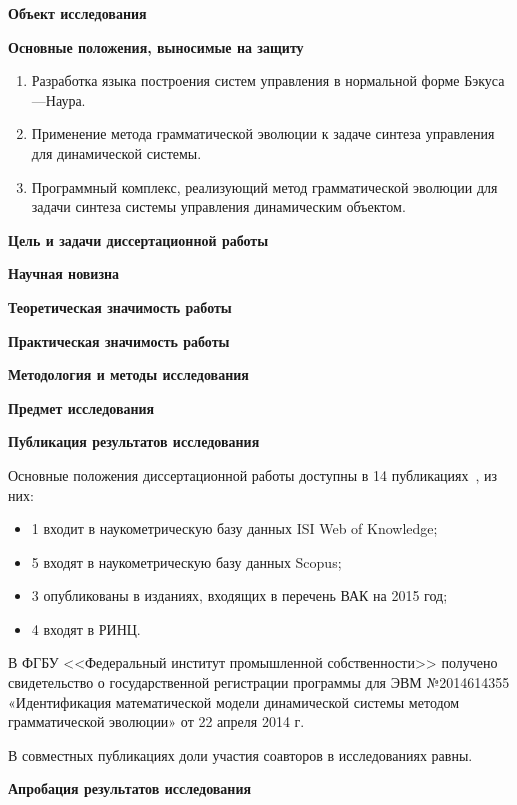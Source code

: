 \textbf{Объект исследования}

\textbf{Основные положения, выносимые на защиту}

\begin{enumerate}
    \item Разработка языка построения систем управления в нормальной форме Бэкуса---Наура.
    \item Применение метода грамматической эволюции к задаче синтеза управления для динамической системы.
    \item Программный комплекс, реализующий метод грамматической эволюции для задачи синтеза системы управления динамическим объектом.
\end{enumerate}

\textbf{Цель и задачи диссертационной работы}

\textbf{Научная новизна}

\textbf{Теоретическая значимость работы}

\textbf{Практическая значимость работы}

\textbf{Методология и методы исследования}

\textbf{Предмет исследования}

\textbf{Публикация результатов исследования}

Основные положения диссертационной работы доступны в 14 публикациях~\cite{DanDiKaSo2015,DivKazSof2014,DivKazSof2013,DivKazSof2013a,ДанДиКаСо2014,ДивееКаза2013,ДивееКаза2012,Казарян2013,Казарян2014,Казарян2014a,КазКулЖар2010,КазХамКоч2014,КулЖарКаз2010}, из них:
\begin{itemize}
    \item 1 входит в наукометрическую базу данных ISI Web of Knowledge;
    \item 5 входят в наукометрическую базу данных Scopus;
    \item 3 опубликованы в изданиях, входящих в перечень ВАК на 2015 год;
    \item 4 входят в РИНЦ.
\end{itemize}

В ФГБУ <<Федеральный институт промышленной собственности>> получено свидетельство о государственной регистрации программы для ЭВМ №2014614355 «Идентификация математической модели динамической системы методом грамматической эволюции» от 22 апреля 2014 г.

В совместных публикациях доли участия соавторов в исследованиях равны.

\textbf{Апробация результатов исследования}

